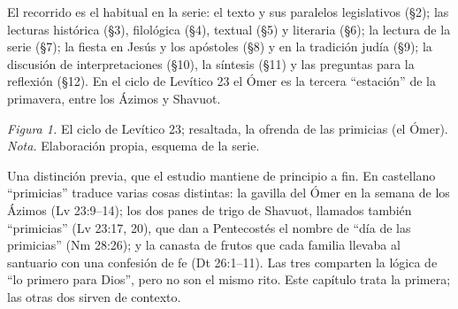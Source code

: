 \documentclass[11pt,letterpaper]{article}
\begin{document}
El recorrido es el habitual en la serie: el texto y sus paralelos legislativos (§2); las lecturas histórica (§3), filológica (§4), textual (§5) y literaria (§6); la lectura de la serie (§7); la fiesta en Jesús y los apóstoles (§8) y en la tradición judía (§9); la discusión de interpretaciones (§10), la síntesis (§11) y las preguntas para la reflexión (§12). En el ciclo de Levítico 23 el Ómer es la tercera ``estación'' de la primavera, entre los Ázimos y Shavuot.

\begin{center}
\par
{\footnotesize\color{sepia}\textit{Figura 1.} El ciclo de Levítico 23; resaltada, la ofrenda de las primicias (el Ómer). \textit{Nota.} Elaboración propia, esquema de la serie.}
\end{center}

Una distinción previa, que el estudio mantiene de principio a fin. En castellano ``primicias'' traduce varias cosas distintas: la gavilla del Ómer en la semana de los Ázimos (Lv 23:9--14); los dos panes de trigo de Shavuot, llamados también ``primicias'' (Lv 23:17, 20), que dan a Pentecostés el nombre de ``día de las primicias'' (Nm 28:26); y la canasta de frutos que cada familia llevaba al santuario con una confesión de fe (Dt 26:1--11). Las tres comparten la lógica de ``lo primero para Dios'', pero no son el mismo rito. Este capítulo trata la primera; las otras dos sirven de contexto.
\end{document}
